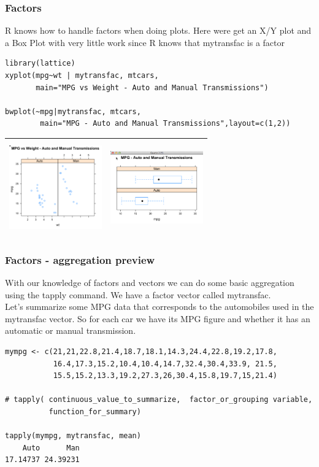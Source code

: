 \documentclass{beamer}
\begin{document}
\begin{frame}[fragile]
\frametitle{Factors}
R knows how to handle factors when doing plots. Here were get an X/Y plot and a Box Plot
with very little work since R knows that mytransfac is a factor
\scriptsize
\begin{verbatim}
library(lattice)
xyplot(mpg~wt | mytransfac, mtcars, 
       main="MPG vs Weight - Auto and Manual Transmissions")

bwplot(~mpg|mytransfac, mtcars, 
        main="MPG - Auto and Manual Transmissions",layout=c(1,2))
\end{verbatim}
\begin{center}
\begin{tabular}{| l | l |}
  \hline         
  \includegraphics[height=4cm,width=4cm]{../IMG/fac1.png} & \includegraphics[height=4cm,width=4cm]{../IMG/fac2.png} \\ \hline  
\end{tabular}
\end{center}
\end{frame}


\begin{frame}[fragile]
\frametitle{Factors - aggregation preview}
With our knowledge of factors and vectors we can do some basic aggregation using the tapply command. We have a factor vector called mytransfac.
\newline
\\
Let's summarize some MPG data that corresponds to the automobiles used in the mytransfac vector. So for each car we have its MPG figure and whether it has an automatic or manual transmission.
\footnotesize
\begin{verbatim}
mympg <- c(21,21,22.8,21.4,18.7,18.1,14.3,24.4,22.8,19.2,17.8,
           16.4,17.3,15.2,10.4,10.4,14.7,32.4,30.4,33.9, 21.5,
           15.5,15.2,13.3,19.2,27.3,26,30.4,15.8,19.7,15,21.4)

# tapply( continuous_value_to_summarize,  factor_or_grouping variable,  
          function_for_summary)

tapply(mympg, mytransfac, mean)
    Auto      Man 
17.14737 24.39231 
\end{verbatim}
\end{frame}
\end{document}
